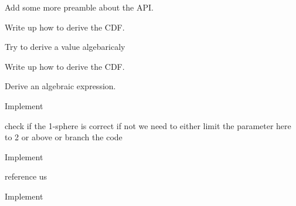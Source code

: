 
\begin{DoxyRefList}
\item[\label{todo__todo000015}%
\hypertarget{todo__todo000015}{}%
Group \hyperlink{group__api}{api} ]Add some more preamble about the A\-P\-I.


\item[\label{todo__todo000001}%
\hypertarget{todo__todo000001}{}%
Global \hyperlink{_cube_8h_aa32dd25cda8601c7f6af2dbd096dc58c}{Cube\-Distance\-C\-D\-F} (double a, double $\ast$b)]Write up how to derive the C\-D\-F.  
\item[\label{todo__todo000002}%
\hypertarget{todo__todo000002}{}%
Global \hyperlink{_cube_8h_ac37d5ff3c99d8637fc414212ac041f18}{Cube\-Distance\-Var} (double $\ast$parameters)]Try to derive a value algebaricaly  
\item[\label{todo__todo000003}%
\hypertarget{todo__todo000003}{}%
Global \hyperlink{_disk_8h_a8958adae00c0c55d68c1e81deb51c06b}{Disk\-Distance\-C\-D\-F} (double a, double $\ast$b)]Write up how to derive the C\-D\-F.  
\item[\label{todo__todo000004}%
\hypertarget{todo__todo000004}{}%
Global \hyperlink{_disk_8h_a156ab336770f189207572a9282158392}{Disk\-Distance\-Var} (double $\ast$parameters)]Derive an algebraic expression.  
\item[\label{todo__todo000007}%
\hypertarget{todo__todo000007}{}%
Global \hyperlink{_hyper_sphere_8h_ae5411ac6ba2485c1e033760ac2245e74}{Hyper\-Sphere\-Distance\-C\-D\-F} (double t, double $\ast$parameters)]Implement  
\item[\label{todo__todo000010}%
\hypertarget{todo__todo000010}{}%
Global \hyperlink{_hyper_sphere_8h_a1fd054315809f3be16b79fc198a2a9b8}{Hyper\-Sphere\-Distance\-Check\-Parameters} (double $\ast$parameters, int $\ast$result, char $\ast$error\-\_\-str)]check if the 1-\/sphere is correct if not we need to either limit the parameter here to 2 or above or branch the code  
\item[\label{todo__todo000008}%
\hypertarget{todo__todo000008}{}%
Global \hyperlink{_hyper_sphere_8h_a650d9f6bdb5043a287c9ed5e67419941}{Hyper\-Sphere\-Distance\-Mean} (double $\ast$parameters)]Implement  
\item[\label{todo__todo000005}%
\hypertarget{todo__todo000005}{}%
Global \hyperlink{_hyper_sphere_8h_ac9f09ad018eaa239847e438a60d75aa3}{Hyper\-Sphere\-Distance\-P\-D\-F} (double t, double $\ast$parameters)]reference us  
\item[\label{todo__todo000009}%
\hypertarget{todo__todo000009}{}%
Global \hyperlink{_hyper_sphere_8h_a967f1346407b9b3263549e1052407fa4}{Hyper\-Sphere\-Distance\-Var} (double $\ast$parameters)]Implement  

\end{DoxyRefList}
